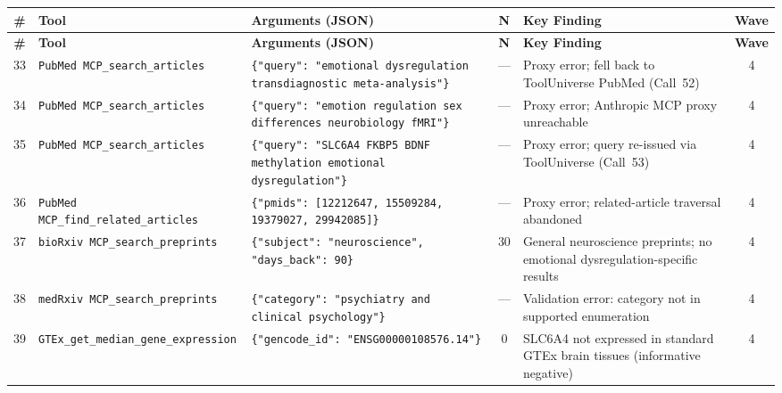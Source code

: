 \small
\setlength{\LTleft}{-1cm}
\setlength{\LTright}{-1cm}
\begin{longtable}{@{}c p{2.6cm} p{5.2cm} c p{3.8cm} c@{}}
\toprule
\textbf{\#} & \textbf{Tool} & \textbf{Arguments (JSON)} &
\textbf{N} & \textbf{Key Finding} & \textbf{Wave} \\
\midrule
\endfirsthead
\toprule
\textbf{\#} & \textbf{Tool} & \textbf{Arguments (JSON)} &
\textbf{N} & \textbf{Key Finding} & \textbf{Wave} \\
\midrule
\endhead
\bottomrule
\endlastfoot


33 &
\texttt{PubMed MCP\allowbreak \_search\_\allowbreak articles} &
\texttt{\{"query": "emotional dysregulation transdiagnostic meta-analysis"\}} &
--- &
Proxy error; fell back to ToolUniverse PubMed (Call~52) &
4 \\
\midrule

34 &
\texttt{PubMed MCP\allowbreak \_search\_\allowbreak articles} &
\texttt{\{"query": "emotion regulation sex differences neurobiology fMRI"\}} &
--- &
Proxy error; Anthropic MCP proxy unreachable &
4 \\
\midrule

35 &
\texttt{PubMed MCP\allowbreak \_search\_\allowbreak articles} &
\texttt{\{"query": "SLC6A4 FKBP5 BDNF methylation emotional dysregulation"\}} &
--- &
Proxy error; query re-issued via ToolUniverse (Call~53) &
4 \\
\midrule

36 &
\texttt{PubMed MCP\allowbreak \_find\_\allowbreak related\_\allowbreak articles} &
\texttt{\{"pmids": [12212647, 15509284, 19379027, 29942085]\}} &
--- &
Proxy error; related-article traversal abandoned &
4 \\
\midrule

37 &
\texttt{bioRxiv MCP\allowbreak \_search\_\allowbreak preprints} &
\texttt{\{"subject": "neuroscience", "days\_back": 90\}} &
30 &
General neuroscience preprints; no emotional dysregulation-specific results &
4 \\
\midrule

38 &
\texttt{medRxiv MCP\allowbreak \_search\_\allowbreak preprints} &
\texttt{\{"category": "psychiatry and clinical psychology"\}} &
--- &
Validation error: category not in supported enumeration &
4 \\
\midrule

39 &
\texttt{GTEx\_get\_\allowbreak median\_gene\_\allowbreak expression} &
\texttt{\{"gencode\_id": "ENSG00000108576.14"\}} &
0 &
SLC6A4 not expressed in standard GTEx brain tissues (informative negative) &
4 \\
\midrule


\end{longtable}
